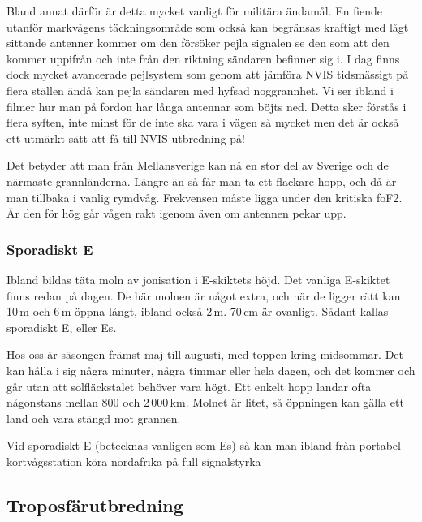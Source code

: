 Bland annat därför är detta mycket vanligt för militära ändamål. En
fiende utanför markvågens täckningsområde som också kan begränsas
kraftigt med lågt sittande antenner kommer om den försöker pejla
signalen se den som att den kommer uppifrån och inte från den riktning
sändaren befinner sig i. I dag finns dock mycket avancerade pejlsystem
som genom att jämföra NVIS tidsmässigt på flera ställen ändå kan pejla
sändaren med hyfsad noggrannhet. Vi ser ibland i filmer hur man på
fordon har långa antennar som böjts ned. Detta sker förstås i flera
syften, inte minst för de inte ska vara i vägen så mycket men det är
också ett utmärkt sätt att få till NVIS-utbredning på!

Det betyder att man från Mellansverige kan nå en stor del av Sverige
och de närmaste grannländerna. Längre än så får man ta ett flackare
hopp, och då är man tillbaka i vanlig rymdvåg. Frekvensen måste ligga
under den kritiska foF2. Är den för hög går vågen rakt igenom även om
antennen pekar upp.

\subsubsection{Sporadiskt E}
\label{sec:es}

Ibland bildas täta moln av jonisation i E-skiktets höjd. Det vanliga
E-skiktet finns redan på dagen. De här molnen är något extra, och när
de ligger rätt kan 10\,m och 6\,m öppna långt, ibland också
2\,m. 70\,cm är ovanligt. Sådant kallas sporadiskt E, eller Es.

Hos oss är säsongen främst maj till augusti, med toppen kring
midsommar. Det kan hålla i sig några minuter, några timmar eller hela
dagen, och det kommer och går utan att solfläckstalet behöver vara
högt. Ett enkelt hopp landar ofta någonstans mellan 800 och
2\,000\,km. Molnet är litet, så öppningen kan gälla ett land och vara
stängd mot grannen.

Vid sporadiskt E (betecknas vanligen som Es) så kan man ibland från
portabel kortvågsstation köra nordafrika på full signalstyrka

\subsection{Troposfärutbredning}

